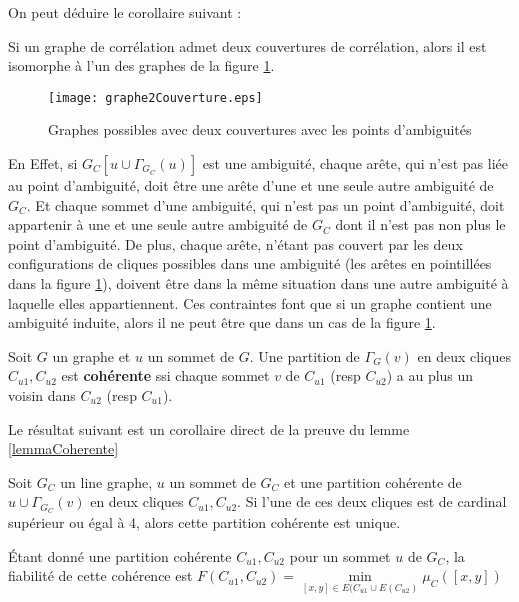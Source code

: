 On peut d\'eduire le corollaire suivant :
\begin{corollary}
Si un graphe de corr\'elation admet deux couvertures de corr\'elation, alors il est isomorphe \`a l'un des graphes de la figure  \ref{graphe2Couverture}.
\end{corollary}
\begin{centering} \vspace{-0.5em}
\begin{figure}[htb!] \vspace{-0.5em}
\texttt{[image: graphe2Couverture.eps]}
\caption{ Graphes possibles avec deux couvertures avec les points d'ambiguit\'es }
\label{graphe2Couverture} 
\end{figure}
\end{centering} 
En Effet, si $G_C[{u} \cup \Gamma_{G_C}(u)]$ est une ambiguit\'e, chaque ar\^ete, qui n'est pas li\'ee au point d'ambiguit\'e, doit \^etre une ar\^ete d'une et une seule autre ambiguit\'e de $G_C$. Et chaque sommet d'une ambiguit\'e, qui n'est pas un point d'ambiguit\'e, doit appartenir \`a une et une seule autre ambiguit\'e de $G_C$ dont il n'est pas non  plus le point d'ambiguit\'e.
De plus, chaque ar\^ete, n'\'etant pas couvert par les deux configurations de cliques possibles dans une ambiguit\'e (les ar\^etes en pointill\'ees dans la figure \ref{graphe2Couverture}), doivent \^etre dans la m\^eme situation dans une autre ambiguit\'e \`a laquelle elles appartiennent.
Ces contraintes font que si un graphe contient une ambiguit\'e induite, alors il ne peut \^etre que dans un cas de la figure  \ref{graphe2Couverture}.

\begin{definition}
Soit $G$ un graphe et $u$ un sommet de $G$. Une partition de $\Gamma_G(v)$ en deux cliques $C_{u1}, C_{u2}$ est {\bf coh\'erente } ssi chaque sommet $v$ de $C_{u1}$ (resp $C_{u2}$) a au plus un voisin dans $C_{u2}$  (resp $C_{u1}$).
\end{definition}
Le r\'esultat suivant est un corollaire direct de la preuve du lemme \ref{lemmaCoherente}
\begin{lemma}
\label{lemmaCoherente}
Soit $G_C$ un line graphe, $u$ un sommet de $G_C$ et une partition coh\'erente de ${u} \cup \Gamma_{G_C}(v)$ en deux cliques  $C_{u1}, C_{u2}$. 
Si l'une de ces deux cliques est de cardinal sup\'erieur ou \'egal \`a $4$, alors cette partition coh\'erente est unique.
\end{lemma}

\'Etant donn\'e une partition coh\'erente $C_{u1}, C_{u2}$ pour un sommet $u$ de $G_C$, la fiabilit\'e de cette coh\'erence est
$F(C_{u1}, C_{u2}) = \min\limits_{[x,y] \in E(C_{u1} \cup E(C_{u2} )}  \mu_{C}([x,y])$

